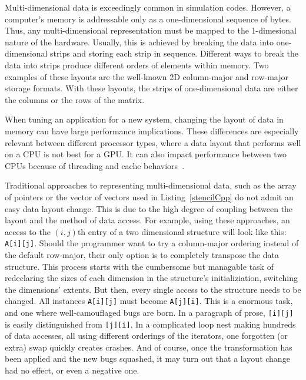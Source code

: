 Multi-dimensional data is exceedingly common in simulation codes.
However, a computer's memory is addressable only as a one-dimensional sequence of bytes.
Thus, any multi-dimensional representation must be mapped to the 1-dimesional nature of the hardware.
Usually, this is achieved by breaking the data into one-dimensional strips and storing each strip in sequence.
Different ways to break the data into strips produce different orders of elements within memory.
Two examples of these layouts are the well-known 2D column-major and row-major storage formats.
With these layouts, the strips of one-dimensional data are either the columns or the rows of the matrix.

When tuning an application for a new system, changing the layout of data in memory can have large performance implications.
These differences are especially relevant between different processor types, where a data layout that performs well on a CPU is not best for a GPU\@.
It can also impact performance between two CPUs because of threading and cache behaviors~\cite{trott2021kokkos}.

Traditional approaches to representing multi-dimensional data, such as the array of pointers or the vector of vectors used in Listing~\ref{stencilCpp} do not admit an easy data layout change.
This is due to the high degree of coupling between the layout and the method of data access. 
For example, using these approaches, an access to the $(i,j)$th entry of a two dimensional structure will look like this: \verb.A[i][j]..
Should the programmer want to try a column-major ordering instead of the default row-major, their only option is to completely transpose the data structure.
This process starts with the cumbersome but managable task of redeclaring the sizes of each dimension in the structure's initializiation, switching the dimensions' extents.
But then, every single access to the structure needs to be changed. 
All instances \verb.A[i][j]. must become \verb.A[j][i]..
This is a enormous task, and one where well-camouflaged bugs are born. 
In a paragraph of prose, \verb.[i][j]. is easily distinguished from \verb.[j][i]..
In a complicated loop nest making hundreds of data accesses, all using different orderings of the iterators, one forgotten (or extra) swap quickly creates crashes.
And of course, once the transformation has been applied and the new bugs squashed, it may turn out that a layout change had no effect, or even a negative one.

